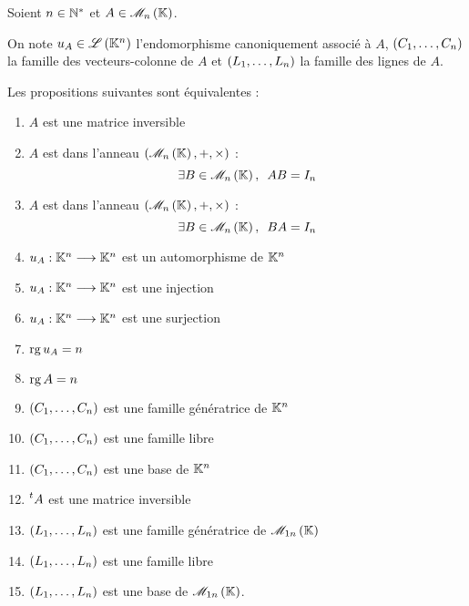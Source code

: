 \begin{bilan}
Soient \(n\in\mathbb{N}^*\) et \(A\in\M{n}\).

On note \(u_A\in\mathscr{L}\left(\mathbb{K}^n\right)\) l'endomorphisme canoniquement associé à \(A\), \(\left(C_1,\dots,C_n\right)\) la famille des vecteurs-colonne de \(A\) et \(\left(L_1,\dots,L_n\right)\) la famille des lignes de \(A\).

Les propositions suivantes sont équivalentes :

\begin{enumerate}
\item \(A\) est une matrice inversible \\

\item \(A\) est  dans l'anneau \(\anneau{\M{n}}\) : \[\quantifs{\exists B\in\M{n}}AB=I_n\]

\item \(A\) est  dans l'anneau \(\anneau{\M{n}}\) : \[\quantifs{\exists B\in\M{n}}BA=I_n\]

\item \(u_A:\mathbb{K}^n\longrightarrow\mathbb{K}^n\) est un automorphisme de \(\mathbb{K}^n\) \\

\item \(u_A:\mathbb{K}^n\longrightarrow\mathbb{K}^n\) est une injection \\

\item \(u_A:\mathbb{K}^n\longrightarrow\mathbb{K}^n\) est une surjection \\

\item \(\operatorname{rg} u_A=n\) \\

\item \(\operatorname{rg} A=n\) \\

\item \(\left(C_1,\dots,C_n\right)\) est une famille génératrice de \(\mathbb{K}^n\) \\

\item \(\left(C_1,\dots,C_n\right)\) est une famille libre \\

\item \(\left(C_1,\dots,C_n\right)\) est une base de \(\mathbb{K}^n\) \\

\item \(\prescript{t}{}{A}\) est une matrice inversible \\

\item \(\left(L_1,\dots,L_n\right)\) est une famille génératrice de \(\M{1n}\) \\

\item \(\left(L_1,\dots,L_n\right)\) est une famille libre \\

\item \(\left(L_1,\dots,L_n\right)\) est une base de \(\M{1n}\).
\end{enumerate}
\end{bilan}

